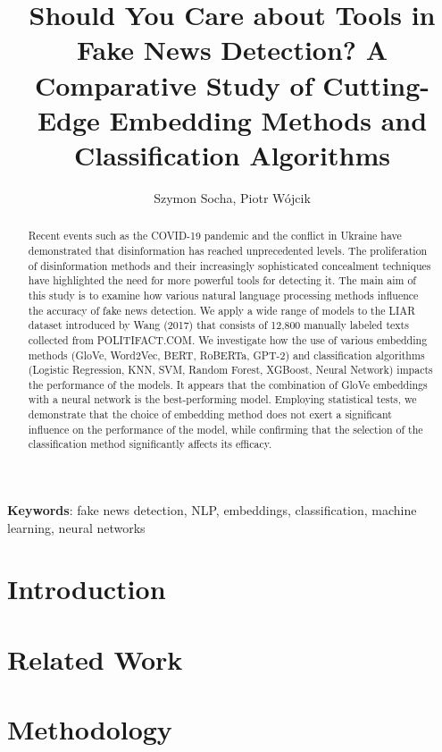 \documentclass[a4paper, 12pt]{article}
\author{Szymon Socha, Piotr Wójcik}
\title{Should You Care about Tools in Fake News Detection? A Comparative Study of Cutting-Edge Embedding Methods and Classification Algorithms}
\date{}
\begin{document}


\maketitle

\begin{abstract}
    Recent events such as the COVID-19 pandemic and the conflict in Ukraine have demonstrated that disinformation has reached unprecedented levels. The proliferation of disinformation methods and their increasingly sophisticated concealment techniques have highlighted the need for more powerful tools for detecting it. 
    The main aim of this study is to examine how various natural language processing methods influence the accuracy of fake news detection. We apply a wide range of models to the LIAR dataset introduced by Wang (2017) that consists of 12,800 manually labeled texts collected from POLITIFACT.COM. We investigate how the use of various embedding methods (GloVe, Word2Vec, BERT, RoBERTa, GPT-2) and classification algorithms (Logistic Regression, KNN, SVM, Random Forest, XGBoost, Neural Network) impacts the performance of the models. It appears that the combination of GloVe embeddings with a neural network is the best-performing model. Employing statistical tests, we demonstrate that the choice of embedding method does not exert a significant influence on the performance of the model, while confirming that the selection of the classification method significantly affects its efficacy.
\end{abstract}

\textbf{Keywords}: fake news detection, NLP, embeddings, classification, machine learning, neural networks


\linespread{1.5}

\section*{Introduction}


\section{Related Work}\label{r:related_work}



\section{Methodology}\label{r:methodology}


\end{document}
